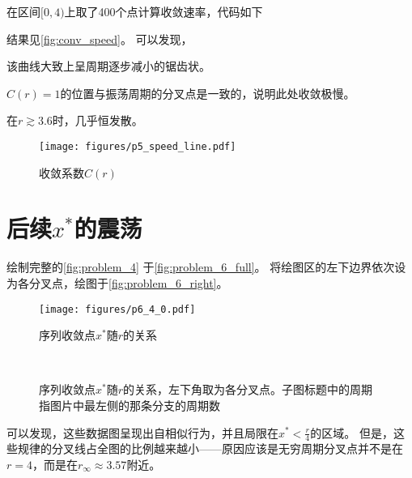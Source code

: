 在区间$[0,4)$上取了400个点计算收敛速率，代码如下
{
    \linespread{1.0}
    
}
结果见\autoref{fig:conv_speed}。
可以发现，
\begin{compactenum}
    \item 该曲线大致上呈周期逐步减小的锯齿状。
    \item $C(r)=1$的位置与振荡周期的分叉点是一致的，说明此处收敛极慢。
    \item 在$r\gtrsim 3.6$时，几乎恒发散。
\end{compactenum}

\begin{figure}
    \centering
    \texttt{[image: figures/p5\_speed\_line.pdf]}
    \caption{收敛系数$C(r)$}
    \label{fig:conv_speed}
\end{figure}

\section{后续\texorpdfstring{$x^*$}{x*}的震荡}
绘制完整的\autoref{fig:problem_4} 于\autoref{fig:problem_6_full}。
将绘图区的左下边界依次设为各分叉点，绘图于\autoref{fig:problem_6_right}。

\begin{figure}
    \centering
    \texttt{[image: figures/p6\_4\_0.pdf]}
    \caption{序列收敛点$x^*$随$r$的关系}
    \label{fig:problem_6_full}
\end{figure}

\begin{figure}
    \centering
    \\
    \caption{序列收敛点$x^*$随$r$的关系，左下角取为各分叉点。子图标题中的周期指图片中最左侧的那条分支的周期数}
    \label{fig:problem_6_right}
\end{figure}

可以发现，这些数据图呈现出自相似行为，并且局限在$x^*<\frac{r}{4}$的区域。
但是，这些规律的分叉线占全图的比例越来越小——原因应该是无穷周期分叉点并不是在$r=4$，而是在$r_\infty \approx 3.57$附近。

